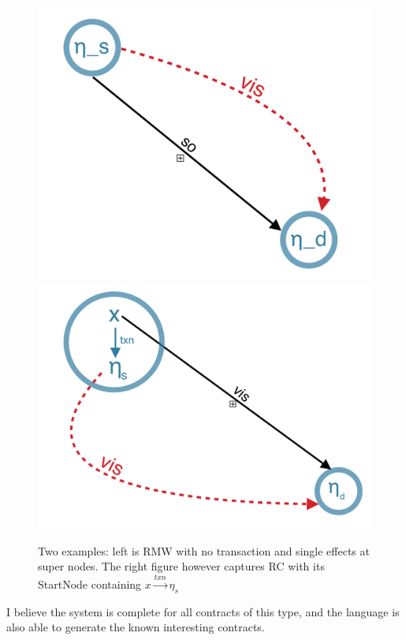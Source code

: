 \documentclass[10, letterpaper]{article}
\begin{document}
\begin {figure} [h]
\centering
\includegraphics [scale=0.25] {rmw} 
\includegraphics [scale=0.25] {rc} 

\caption {Two examples: left is RMW with no transaction and single effects at super nodes. The right figure however captures RC with its StartNode containing $x \xrightarrow{txn} \eta_s$}
\end {figure}

I believe the system is complete for all contracts of this type, and the language is also able to generate the known interesting contracts. 
\end{document}
